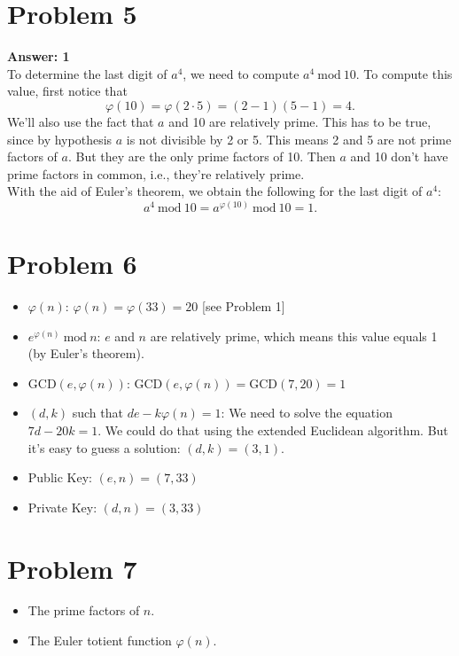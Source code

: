 \documentclass[11pt]{article}
\newcommand{\Mod}[1]{\:\mathrm{mod}\:#1}
\begin{document}
\section*{Problem 5}
\label{sec:org57326ed}
\textbf{Answer: 1}\\[0pt]

To determine the last digit of \(a^{4}\), we need to compute \(a^{4}\Mod 10\). To
compute this value, first notice that
\begin{equation}
\varphi(10)=\varphi(2\cdot 5)=(2-1)(5-1)=4.
\end{equation}
We'll also use the fact that \(a\) and 10 are relatively prime. This has to be
true, since by hypothesis \(a\) is not divisible by 2 or 5. This means 2 and 5 are
not prime factors of \(a\). But they are the only prime factors of 10. Then \(a\)
and 10 don't have prime factors in common, i.e., they're relatively prime.\\[0pt]
With the aid of Euler's theorem, we obtain the following for the last digit of
\(a^{4}\):
\begin{equation}
a^{4}\Mod 10=a^{\varphi(10)}\Mod 10=1.
\end{equation}

\section*{Problem 6}
\label{sec:org22a2167}
\begin{itemize}
\item \(\varphi(n)\): \(\varphi(n)=\varphi(33)=20\) [see Problem 1]
\item \(e^{\varphi(n)}\Mod n\): \(e\) and \(n\) are relatively prime, which means this
value equals 1 (by Euler's theorem).
\item \(\mathrm{GCD}(e,\varphi(n))\): \(\mathrm{GCD}(e,\varphi(n))=\mathrm{GCD}(7,20)=1\)
\item \((d,k)\) such that \(de-k\varphi(n)=1\): We need to solve the equation
\(7d-20k=1\). We could do that using the extended Euclidean algorithm. But it's
easy to guess a solution: \((d,k)=(3,1)\).
\item Public Key: \((e,n)=(7,33)\)
\item Private Key: \((d,n)=(3,33)\)
\end{itemize}

\section*{Problem 7}
\label{sec:orgc9dabde}
\begin{itemize}
\item The prime factors of \(n\).
\item The Euler totient function \(\varphi(n)\).
\end{itemize}
\end{document}
